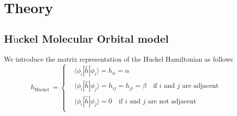 \documentclass[twoside,twocolumn,9pt]{article}
\begin{document}

  


\section{Theory}
\subsection{H$\ddot{\text{u}}$ckel Molecular Orbital model}

We introduce the matrix representation of the H$\ddot{\text{u}}$ckel Hamiltonian as follows
\begin{equation}
  h_{\text{H$\ddot{\text{u}}$ckel }} = \left\{
  \begin{aligned}
    & \langle \phi_i | \hat{h} | \phi_i \rangle = h_{ii} = \alpha\\
    & \langle \phi_i | \hat{h} | \phi_j \rangle = h_{ij} = h_{ji} = \beta \quad \text{if } i \text{ and } j \text{ are adjacent}\\
    & \langle \phi_i | \hat{h} | \phi_j \rangle = 0 \quad \text{if } i \text{ and } j \text{ are not adjacent}\\
  \end{aligned}
  \right.
\end{equation}
\end{document}
